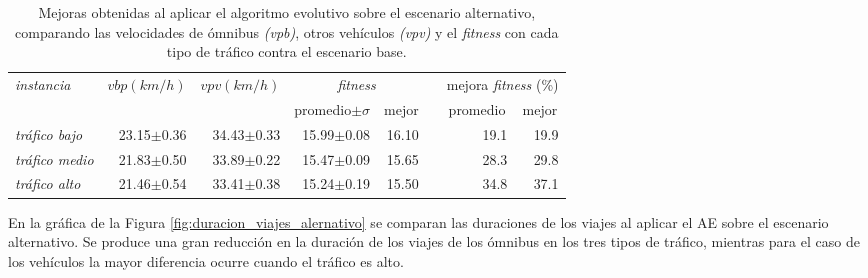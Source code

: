 \begin{table}[h]
	\renewcommand{\arraystretch}{1.2}
	\caption[Valores numéricos al aplicar el AE sobre el escenario alternativo.]{Mejoras obtenidas al aplicar el algoritmo evolutivo sobre el escenario alternativo, comparando las velocidades de ómnibus \textit{(vpb)}, otros vehículos \textit{(vpv)} y el \emph{fitness} con cada tipo de tráfico contra el escenario base.}
	\label{table:mejoras_trafico_alternativo_algoritmo}
	\centering
	\begin{tabular}{lrrrrrrr}
		\hline 
		\textit{instancia}& 
		$vbp(km/h)$& 
		$vpv(km/h)$&
		\multicolumn{2}{c}{\emph{fitness}}&  & 
		\multicolumn{2}{c}{mejora \emph{fitness} (\%)}\\  \cline{4-5} \cline{7-8}&     &     & \multicolumn{1}{c}{promedio$\pm\sigma$} & \multicolumn{1}{c}{mejor} &  & \multicolumn{1}{c}{promedio} & \multicolumn{1}{c}{mejor} \\ \hline

	\textit{tráfico bajo} & 23.15$\pm$0.36 & 34.43$\pm$0.33 & 15.99$\pm$0.08 & 16.10 & & 19.1& 19.9 \\
		\textit{tráfico medio} & 21.83$\pm$0.50  & 33.89$\pm$0.22 & 15.47$\pm$0.09& 15.65 & & 28.3 & 29.8\\
		\textit{tráfico alto} & 21.46$\pm$0.54  & 33.41$\pm$0.38 & 15.24$\pm$0.19& 15.50 & & 34.8 & 37.1\\	
		\hline		    
	\end{tabular}
\end{table}

En la gráfica de la Figura \ref{fig:duracion_viajes_alernativo} se comparan las duraciones de los viajes al aplicar el AE sobre el escenario alternativo. Se produce una gran reducción en la duración de los viajes de los ómnibus en los tres tipos de tráfico, mientras para el caso de los vehículos la mayor diferencia ocurre cuando el tráfico es alto.

